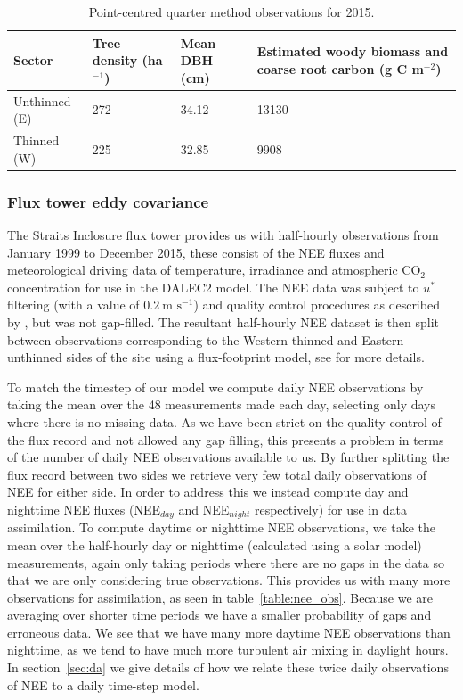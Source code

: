 \documentclass[draft,linenumbers]{agujournal}
\begin{document}
\begin{table}[ht] 
	\caption{Point-centred quarter method observations for 2015.}
\begin{center}
	\begin{tabular}{| l | p{2cm} | p{2cm} | p{4.5cm} |}
	\hline
	Sector & Tree density (ha\(^{-1}\)) & Mean DBH (cm) & Estimated woody biomass and coarse root carbon (g C m\(^{-2}\)) \\ \hline
	Unthinned (E) & 272 & 34.12 & 13130 \\ \hline
	Thinned (W) & 225 & 32.85 & 9908 \\ \hline
	\end{tabular}
	\label{table:cwoo_obs}
\end{center} 
\end{table}

\subsubsection{Flux tower eddy covariance} \label{sec:eddycov} 

The Straits Inclosure flux tower provides us with half-hourly observations from January 1999 to December 2015, these consist of the NEE fluxes and meteorological driving data of temperature, irradiance and atmospheric CO\(_{2}\) concentration for use in the DALEC2 model. The NEE data was subject to \(u^*\) filtering (with a value of \(0.2~\text{m s}^{-1}\)) and quality control procedures as described by \citet{papale2006towards}, but was not gap-filled. The resultant half-hourly NEE dataset is then split between observations corresponding to the Western thinned and Eastern unthinned sides of the site using a flux-footprint model, see \citet{wilkinson2015effects} for more details.  

To match the timestep of our model we compute daily NEE observations by taking the mean over the 48 measurements made each day, selecting only days where there is no missing data. As we have been strict on the quality control of the flux record and not allowed any gap filling, this presents a problem in terms of the number of daily NEE observations available to us. By further splitting the flux record between two sides we retrieve very few total daily observations of NEE for either side. In order to address this we instead compute day and nighttime NEE fluxes (NEE\(_{day}\) and NEE\(_{night}\) respectively) for use in data assimilation. To compute daytime or nighttime NEE observations, we take the mean over the half-hourly day or nighttime (calculated using a solar model) measurements, again only taking periods where there are no gaps in the data so that we are only considering true observations. This provides us with many more observations for assimilation, as seen in table~\ref{table:nee_obs}. Because we are averaging over shorter time periods we have a smaller probability of gaps and erroneous data. We see that we have many more daytime NEE observations than nighttime, as we tend to have much more turbulent air mixing in daylight hours. In section~\ref{sec:da} we give details of how we relate these twice daily observations of NEE to a daily time-step model.     
\end{document}
